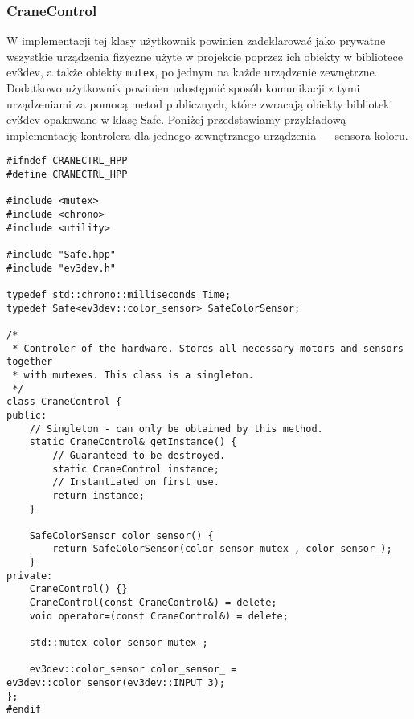 \documentclass{article}
\begin{document}
\subsubsection*{CraneControl}
W implementacji tej klasy użytkownik powinien zadeklarować jako prywatne wszystkie urządzenia
fizyczne użyte w projekcie poprzez ich obiekty w bibliotece ev3dev, a także
obiekty \texttt{mutex}, po jednym na każde urządzenie zewnętrzne. Dodatkowo
użytkownik powinien udostępnić sposób komunikacji z tymi urządzeniami za
pomocą metod publicznych, które zwracają obiekty biblioteki ev3dev opakowane w
klasę Safe. Poniżej przedstawiamy przykładową implementację kontrolera dla
jednego zewnętrznego urządzenia --- sensora koloru.
\begin{lstlisting}
#ifndef CRANECTRL_HPP
#define CRANECTRL_HPP

#include <mutex>
#include <chrono>
#include <utility>

#include "Safe.hpp"
#include "ev3dev.h"

typedef std::chrono::milliseconds Time;
typedef Safe<ev3dev::color_sensor> SafeColorSensor;

/*
 * Controler of the hardware. Stores all necessary motors and sensors together
 * with mutexes. This class is a singleton.
 */
class CraneControl {
public:
    // Singleton - can only be obtained by this method.
    static CraneControl& getInstance() {
        // Guaranteed to be destroyed.
        static CraneControl instance;
        // Instantiated on first use.
        return instance;
    }

    SafeColorSensor color_sensor() {
        return SafeColorSensor(color_sensor_mutex_, color_sensor_);
    }
private:
    CraneControl() {}
    CraneControl(const CraneControl&) = delete;
    void operator=(const CraneControl&) = delete;

    std::mutex color_sensor_mutex_;

    ev3dev::color_sensor color_sensor_ = ev3dev::color_sensor(ev3dev::INPUT_3);
};
#endif
\end{lstlisting}
\end{document}
